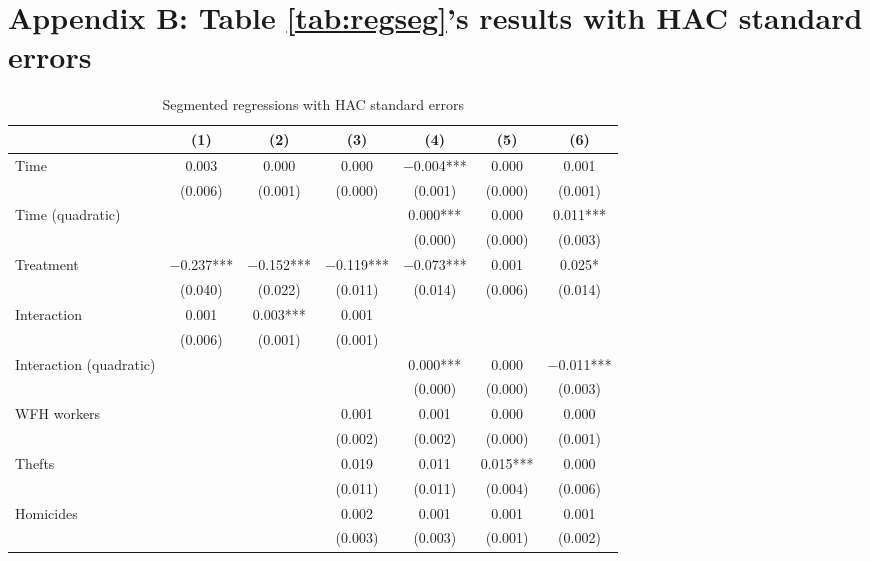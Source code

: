 \documentclass[11pt,a4paper]{article}\usepackage[]{graphicx}\usepackage[]{xcolor}
\begin{document}
\section*{Appendix B: Table \ref{tab:regseg}'s results with HAC standard errors}
\label{sec:appb}
\setcounter{table}{0} %
\renewcommand{\thetable}{B.\arabic{table}} %
\begin{table}[h]
\caption{Segmented regressions with HAC standard errors}
\label{app:seg}

\begin{tabular}[t]{lcccccc}
\toprule
  & (1) & (2) & (3) & (4) & (5) & (6)\\
\midrule
Time & \num{0.003} & \num{0.000} & \num{0.000} & \num{-0.004}*** & \num{0.000} & \num{0.001}\\
 & (\num{0.006}) & (\num{0.001}) & (\num{0.000}) & (\num{0.001}) & (\num{0.000}) & (\num{0.001})\\
Time (quadratic) &  &  &  & \num{0.000}*** & \num{0.000} & \num{0.011}***\\
 &  &  &  & (\num{0.000}) & (\num{0.000}) & \vphantom{1} (\num{0.003})\\
Treatment & \num{-0.237}*** & \num{-0.152}*** & \num{-0.119}*** & \num{-0.073}*** & \num{0.001} & \num{0.025}*\\
 & (\num{0.040}) & (\num{0.022}) & (\num{0.011}) & (\num{0.014}) & (\num{0.006}) & (\num{0.014})\\
Interaction & \num{0.001} & \num{0.003}*** & \num{0.001} &  &  & \\
 & (\num{0.006}) & (\num{0.001}) & (\num{0.001}) &  &  & \\
Interaction (quadratic) &  &  &  & \num{0.000}*** & \num{0.000} & \num{-0.011}***\\
 &  &  &  & (\num{0.000}) & (\num{0.000}) & (\num{0.003})\\
WFH workers &  &  & \num{0.001} & \num{0.001} & \num{0.000} & \num{0.000}\\
 &  &  & (\num{0.002}) & (\num{0.002}) & (\num{0.000}) & (\num{0.001})\\
Thefts &  &  & \num{0.019} & \num{0.011} & \num{0.015}*** & \num{0.000}\\
 &  &  & (\num{0.011}) & (\num{0.011}) & (\num{0.004}) & (\num{0.006})\\
Homicides &  &  & \num{0.002} & \num{0.001} & \num{0.001} & \num{0.001}\\
 &  &  & (\num{0.003}) & (\num{0.003}) & (\num{0.001}) & (\num{0.002})\\

\end{tabular}
\end{table}
\end{document}
